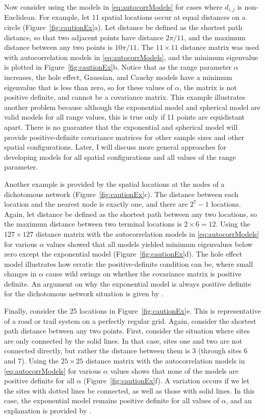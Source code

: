 \documentclass[11pt, titlepage]{article}\usepackage[]{graphicx}\usepackage[]{color}
\begin{document}
\begin{spacing}{1.9}
\begin{flushleft}
Now consider using the models in \ref{eq:autocorrModels} for cases where $d_{i,j}$ is non-Euclidean.  For example, let 11 spatial locations occur at equal distances on a circle (Figure~\ref{fig:cautionEx}a).  Let distance be defined as the shortest path distance, so that two adjacent points have distance $2\pi/11$, and the maximum distance between any two points is $10\pi/11$.  The $11 \times 11$ distance matrix was used with autocorrelation models in \ref{eq:autocorrModels}, and the minimum eigenvalue is plotted in Figure~\ref{fig:cautionEx}b.  Notice that as the range parameter $\alpha$ increases, the hole effect, Gaussian, and Cauchy models have a minimum eigenvalue that is less than zero, so for these values of $\alpha$, the matrix is not positive definite, and cannot be a covariance matrix. This example illustrates another problem because although the exponential model and spherical model are valid models for all range values, this is true only if 11
points are equidistant apart. There is no guarantee that the exponential and spherical model will provide positive-definite covariance matrices for other sample sizes and other spatial configurations.  Later, I will discuss more general approaches for developing models for all spatial configurations and all values of the range parameter.

Another example is provided by the spatial locations at the nodes of a dichotomous network (Figure~\ref{fig:cautionEx}c). The distance between each location and the nearest node is exactly one, and there are $2^7 - 1$ locations.  Again, let distance be defined as the shortest path between any two locations, so the maximum distance between two terminal locations is $2 \times 6 = 12$.  Using the $127 \times 127$ distance matrix with the autocorrelation models in \ref{eq:autocorrModels} for various $\alpha$ values showed that all models yielded minimum eigenvalues below zero except the exponential model (Figure~\ref{fig:cautionEx}d).  The hole effect model illustrates how erratic the positive-definite condition can be, where small changes in $\alpha$ cause wild swings on whether the covariance matrix is positive definite. An argument on why the exponential model is always positive definite for the dichotomous network situation is given by \citet{Ver:Pete:Move:2010}.

Finally, consider the 25 locations in Figure~\ref{fig:cautionEx}e.  This is representative of a road or trail system on a perfectly regular grid.  Again, consider the shortest path distance between any two points.  First, consider the situation where sites are only connected by the solid lines.  In that case, sites one and two are not connected directly, but rather the distance between them is 3 (through sites 6 and 7).  Using the $25 \times 25$ distance matrix with the autocorrelation models in \ref{eq:autocorrModels} for various $\alpha$ values shows that none of the models are positive definite for all $\alpha$ (Figure~\ref{fig:cautionEx}f). A variation occurs if we let the sites with dotted lines be connected, as well as those with solid lines.  In this case, the exponential model remains positive definite for all values of $\alpha$, and an explanation is provided by \citet{Curr:NonE:2006}.


\end{flushleft}
\end{spacing}
\end{document}
